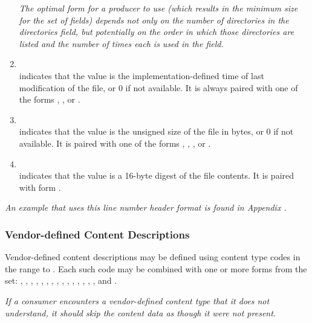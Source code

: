 \begin{enumerate}[1. ]
\textit{The optimal form for a producer to use (which results in the
minimum size for the set of  fields) depends not only
on the number of directories in the directories
field, but potentially on the order in which those directories are
listed and the number of times each is used in the  field.}

\item \DWLNCTtimestampTARG \\
\DWLNCTtimestampNAME{} indicates that the value is the implementation-defined 
time of last modification of the file, or 0 if not available. 
It is always paired with one of the forms
\DWFORMudata, \DWFORMdatafour, \DWFORMdataeight{} or \DWFORMblock.
   
\item  \DWLNCTsizeTARG \\
\DWLNCTsizeNAME{} indicates that the value is the unsigned size of the
file in bytes, or 0 if not available. It is paired with one of the
forms \DWFORMudata, \DWFORMdataone, \DWFORMdatatwo, \DWFORMdatafour{}
or \DWFORMdataeight.
 
\item \DWLNCTMDfiveTARG \\
\DWLNCTMDfiveNAME{} indicates that the value is a 16-byte \MDfive{} digest
of the file contents. It is paired with form \DWFORMdatasixteen.
\end{enumerate}

\textit{An example that uses this line number header format
is found in Appendix .}

\subsubsection{Vendor-defined Content Descriptions}
\label{chap:vendordefinedcontentdescriptions}
Vendor-defined content descriptions may be defined using content
type codes in the range \DWLNCTlouserNAME{} to \DWLNCThiuserNAME{}. Each
such code may be combined with one or more forms from the set:
\DWFORMblock, \DWFORMblockone, \DWFORMblocktwo, \DWFORMblockfour,
\DWFORMdataone, \DWFORMdatatwo, \DWFORMdatafour, \DWFORMdataeight,
\DWFORMdatasixteen,
\DWFORMflag, \DWFORMlinestrp, \DWFORMsdata, \DWFORMsecoffset,
\DWFORMstring, \DWFORMstrp, \DWFORMstrx{}  and \DWFORMudata.

\textit{If a consumer encounters a vendor-defined content type that
it does not understand, it should skip the content data as though
it were not present.}

